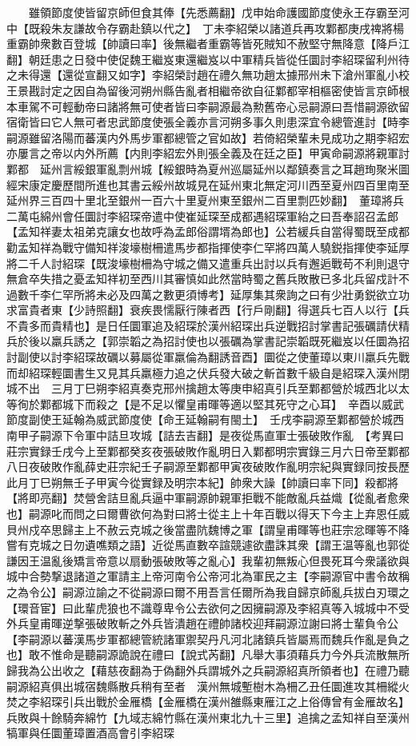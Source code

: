 　　雖領節度使皆留京師但食其俸【先悉薦翻】戊申始命護國節度使永王存霸至河中【既殺朱友謙故令存霸赴鎮以代之】　丁未李紹榮以諸道兵再攻鄴都庚戌禆將楊重霸帥衆數百登城【帥讀曰率】後無繼者重霸等皆死賊知不赦堅守無降意【降戶江翻】朝廷患之日發中使促魏王繼岌東還繼岌以中軍精兵皆從任圜討李紹琛留利州待之未得還【還從宣翻又如字】李紹榮討趙在禮久無功趙太據邢州未下滄州軍亂小校王景戡討定之因自為留後河朔州縣告亂者相繼帝欲自征鄴都宰相樞密使皆言京師根本車駕不可輕動帝曰諸將無可使者皆曰李嗣源最為勲舊帝心忌嗣源曰吾惜嗣源欲留宿衛皆曰它人無可者忠武節度使張全義亦言河朔多事久則患深宜令總管進討【時李嗣源雖留洛陽而蕃漢内外馬步軍都總管之官如故】若倚紹榮輩未見成功之期李紹宏亦屢言之帝以内外所薦【内則李紹宏外則張全義及在廷之臣】甲寅命嗣源將親軍討鄴都　延州言綏銀軍亂剽州城【綏銀時為夏州巡屬延州以鄰鎮奏言之耳趙珣聚米圖經宋康定慶歷間所進也其書云綏州故城見在延州東北無定河川西至夏州四百里南至延州界三百四十里北至銀州一百六十里夏州東至銀州二百里剽匹妙翻】　董璋將兵二萬屯綿州會任圜討李紹琛帝遣中使崔延琛至成都遇紹琛軍紿之曰吾奉詔召孟郎【孟知祥妻太祖弟克讓女也故呼為孟郎俗謂壻為郎也】公若緩兵自當得蜀既至成都勸孟知祥為戰守備知祥浚壕樹柵遣馬步都指揮使李仁罕將四萬人驍鋭指揮使李延厚將二千人討紹琛【既浚壕樹柵為守城之備又遣重兵出討以兵有邂逅戰苟不利則退守無倉卒失措之憂孟知祥初至西川其審慎如此然當時蜀之舊兵敗散已多北兵留戍計不過數千李仁罕所將未必及四萬之數更須博考】延厚集其衆詢之曰有少壯勇鋭欲立功求富貴者東【少詩照翻】衰疾畏懦厭行陳者西【行戶剛翻】得選兵七百人以行【兵不貴多而貴精也】是日任圜軍追及紹琛於漢州紹琛出兵逆戰招討掌書記張礪請伏精兵於後以羸兵誘之【郭崇韜之為招討使也以張礪為掌書記崇韜既死繼岌以任圜為招討副使以討李紹琛故礪以募屬從軍羸倫為翻誘音酉】圜從之使董璋以東川羸兵先戰而却紹琛輕圜書生又見其兵羸極力追之伏兵發大破之斬首數千級自是紹琛入漢州閉城不出　三月丁巳朔李紹真奏克邢州擒趙太等庚申紹真引兵至鄴都營於城西北以太等徇於鄴都城下而殺之【是不足以懼皇甫暉等適以堅其死守之心耳】　辛酉以威武節度副使王延翰為威武節度使【命王延翰嗣有閩土】　壬戌李嗣源至鄴都營於城西南甲子嗣源下令軍中詰旦攻城【詰去吉翻】是夜從馬直軍士張破敗作亂　【考異曰莊宗實録壬戌今上至鄴都癸亥夜張破敗作亂明日入鄴都明宗實錄三月六日帝至鄴都八日夜破敗作亂薛史莊宗紀壬子嗣源至鄴都甲寅夜破敗作亂明宗紀與實録同按長歷此月丁巳朔無壬子甲寅今從實録及明宗本紀】帥衆大譟【帥讀曰率下同】殺都將【將即亮翻】焚營舍詰旦亂兵逼中軍嗣源帥親軍拒戰不能敵亂兵益熾【從亂者愈衆也】嗣源叱而問之曰爾曹欲何為對曰將士從主上十年百戰以得天下今主上弃恩任威貝州戍卒思歸主上不赦云克城之後當盡阬魏博之軍【謂皇甫暉等也莊宗忿暉等不降嘗有克城之日勿遺噍類之語】近從馬直數卒諠競遽欲盡誅其衆【謂王温等亂也郭從謙因王温亂後矯言帝意以扇動張破敗等之亂心】我輩初無叛心但畏死耳今衆議欲與城中合勢撃退諸道之軍請主上帝河南令公帝河北為軍民之主【李嗣源官中書令故稱之為令公】嗣源泣諭之不從嗣源曰爾不用吾言任爾所為我自歸京師亂兵拔白刃環之【環音宦】曰此輩虎狼也不識尊卑令公去欲何之因擁嗣源及李紹真等入城城中不受外兵皇甫暉逆撃張破敗斬之外兵皆潰趙在禮帥諸校迎拜嗣源泣謝曰將士輩負令公【李嗣源以蕃漢馬步軍都總管統諸軍禦契丹凡河北諸鎮兵皆屬焉而魏兵作亂是負之也】敢不惟命是聽嗣源詭說在禮曰【說式芮翻】凡舉大事須藉兵力今外兵流散無所歸我為公出收之【藉慈夜翻為于偽翻外兵謂城外之兵嗣源紹真所領者也】在禮乃聽嗣源紹真俱出城宿魏縣散兵稍有至者　漢州無城塹樹木為柵乙丑任圜進攻其柵縱火焚之李紹琛引兵出戰於金雁橋【金雁橋在漢州雒縣東雁江之上俗傳曾有金雁故名】兵敗與十餘騎奔綿竹【九域志綿竹縣在漢州東北九十三里】追擒之孟知祥自至漢州犒軍與任圜董璋置酒高會引李紹琛